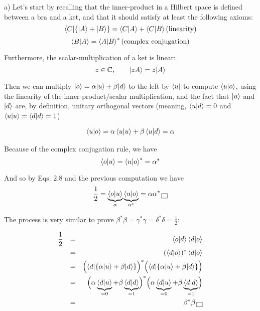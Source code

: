 \documentclass[solutions.tex]{subfiles}
\begin{document}
\hrr

a) Let's start by recalling that the inner-product in a Hilbert
space is defined between a bra and a ket, and that it should satisfy
at least the following axioms:
\[
	\langle C|\{|A\rangle+|B\rangle\} = \left\langle C \middle| A \right\rangle + \left\langle C \middle| B \right\rangle
	(\text{linearity})
\]
\[
	\left\langle B \middle| A \right\rangle = \left\langle A \middle| B \right\rangle^* (\text{complex conjugation})
\]

Furthermore, the scalar-multiplication of a ket is linear:
\[
	z\in\mathbb{C},\qquad |zA\rangle = z|A\rangle
\]

Then we can multiply $|o\rangle = \alpha|u\rangle + \beta|d\rangle$ to
the left by $\langle u|$ to compute $\left\langle u \middle| o \right\rangle$, using the linearity
of the inner-product/scalar multiplication, and the fact that $|u\rangle$
and $|d\rangle$ are, by definition, unitary orthogonal vectors
(meaning, $\left\langle u \middle| d \right\rangle = 0$ and
$\left\langle u \middle| u \right\rangle=\left\langle d \middle| d \right\rangle = 1$)

\begin{equation*}\begin{aligned}
	\left\langle u \middle| o \right\rangle = \alpha\left\langle u \middle| u \right\rangle +\beta\left\langle u \middle| d \right\rangle = \alpha
\end{aligned}\end{equation*}

Because of the complex conjugation rule, we have
\[
	\left\langle o \middle| u \right\rangle = \left\langle u \middle| o \right\rangle^* = \alpha^*
\]

And so by Eqs. $2.8$ and the previous computation we have
\[
	\frac12 = \underbrace{\left\langle o \middle| u \right\rangle}_\alpha
		\underbrace{\left\langle u \middle| o \right\rangle}_{\alpha^*} = \alpha\alpha^* \,\boxed{\,}
\]

The process is very similar to prove $\beta^*\beta = \gamma^*\gamma
= \delta^*\delta = \frac12$:

\begin{equation*}\begin{aligned}
	\frac12 &&=&& \left\langle o \middle| d \right\rangle\left\langle d \middle| o \right\rangle \\
	~ &&=&& (\left\langle d \middle| o \right\rangle)^*\left\langle d \middle| o \right\rangle \\
	~ &&=&& \Bigl(\langle d|\{\alpha|u\rangle + \beta|d\rangle\}\Bigr)^*
		\Bigl(\langle d|\{\alpha|u\rangle + \beta|d\rangle\}\Bigr) \\
	~ &&=&& \Bigl(\alpha\underbrace{\left\langle d \middle| u \right\rangle}_{=0} +
			\beta\underbrace{\left\langle d \middle| d \right\rangle}_{=1}\Bigr)^*
		\Bigl(\alpha\underbrace{\left\langle d \middle| u \right\rangle}_{=0} +
			\beta\underbrace{\left\langle d \middle| d \right\rangle}_{=1}\Bigr) \\
	~ &&=&& \beta^*\beta\,\boxed{\,}
\end{aligned}\end{equation*}
\end{document}
